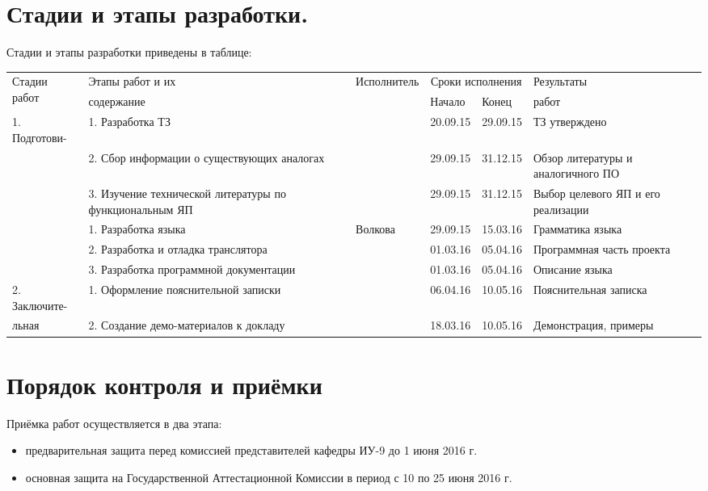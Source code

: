 \documentclass[12pt,a4paper,oneside]{extarticle}
\begin{document}
\section{Стадии и этапы разработки.}
    Стадии и этапы разработки приведены в таблице: \\
    \begin{tabular}{| p{2.5cm} | p{3.3cm} | p{2.5cm} | p{2cm} | p{2cm} | p{3cm} |} \hline
        \multirow{2}{*}{Стадии работ}           & Этапы работ и их  & \multirow{2}{*}{Исполнитель}  & \multicolumn{2}{c|}{Сроки исполнения} & Результаты \\
        \hhline{~~~--~}                         & содержание        &                               & Начало   & Конец                      & работ\\ \hline
        1. Подготови-                           & 1. Разработка ТЗ  &                               & 20.09.15 & 29.09.15                   & ТЗ утверждено \\
        \hhline{~-~---}\multirow{2}{*}{тельная} & 2. Сбор информации о существующих аналогах    &   & 29.09.15 & 31.12.15                   & Обзор литературы и аналогичного ПО \\
        \hhline{~-~---}                         & 3. Изучение технической литературы по функциональным ЯП &   & 29.09.15 & 31.12.15                   & Выбор целевого ЯП и его реализации \\
        \hhline{--~---}\multirow{3}{*}{2. Основная}& 1. Разработка языка                  & Волкова & 29.09.15 & 15.03.16                   & Грамматика языка \\
        \hhline{~-~---}                         & 2. Разработка и отладка транслятора           &   & 01.03.16 & 05.04.16                   & Программная часть проекта \\
        \hhline{~-~---}                         & 3. Разработка программной документации        &   & 01.03.16 & 05.04.16                   & Описание языка \\
        \hhline{--~---}2. Заключите-            & 1. Оформление пояснительной записки           &   & 06.04.16 & 10.05.16                   & Пояснительная записка \\
        \hhline{~-~---}льная                    & 2. Создание демо-материалов к докладу         &   & 18.03.16 & 10.05.16                   & Демонстрация, примеры \\ \hline
    \end{tabular}

\section{Порядок контроля и приёмки}
    Приёмка работ осуществляется в два этапа:
        \begin{itemize}
            \item предварительная защита перед комиссией представителей кафедры ИУ-9 до 1 июня 2016 г.
            \item основная защита на Государственной Аттестационной Комиссии в период с 10 по 25 июня 2016 г.
        \end{itemize}
\end{document}
